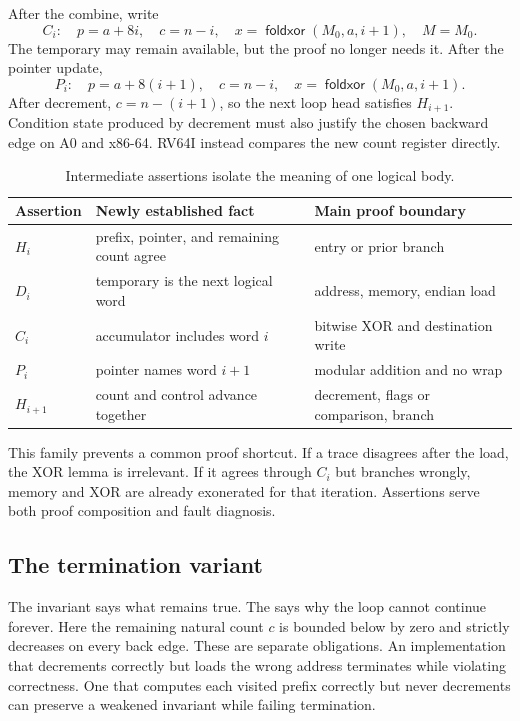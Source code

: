 After the combine, write
\[
 C_i:\quad p=a+8i,\quad c=n-i,\quad
 x=\mathop{\mathsf{foldxor}}(M_0,a,i+1),\quad M=M_0.
\]
The temporary may remain available, but the proof no longer needs it. After
the pointer update,
\[
 P_i:\quad p=a+8(i+1),\quad c=n-i,\quad
 x=\mathop{\mathsf{foldxor}}(M_0,a,i+1).
\]
After decrement, \(c=n-(i+1)\), so the next loop head satisfies
\(H_{i+1}\). Condition state produced by decrement must also justify the
chosen backward edge on A0 and x86-64. RV64I instead compares the new count
register directly.

\begin{table}[htbp]
\centering
\caption{Intermediate assertions isolate the meaning of one logical body.}
\begin{tabular}{@{}p{}p{}p{}@{}}
\toprule
Assertion & Newly established fact & Main proof boundary \\
\midrule
\(H_i\) & prefix, pointer, and remaining count agree & entry or prior branch \\
\(D_i\) & temporary is the next logical word & address, memory, endian load \\
\(C_i\) & accumulator includes word \(i\) & bitwise XOR and destination write \\
\(P_i\) & pointer names word \(i+1\) & modular addition and no wrap \\
\(H_{i+1}\) & count and control advance together & decrement, flags or comparison, branch \\
\bottomrule
\end{tabular}
\label{tab:xor-intermediate-assertions}
\end{table}

This family prevents a common proof shortcut. If a trace disagrees after the
load, the XOR lemma is irrelevant. If it agrees through \(C_i\) but branches
wrongly, memory and XOR are already exonerated for that iteration. Assertions
serve both proof composition and fault diagnosis.

\subsection{The termination variant}

The invariant says what remains true. The  says why the loop
cannot continue forever. Here the remaining natural count \(c\) is bounded
below by zero and strictly decreases on every back edge. These are separate
obligations. An implementation that decrements correctly but loads the wrong
address terminates while violating correctness. One that computes each
visited prefix correctly but never decrements can preserve a weakened
invariant while failing termination.

